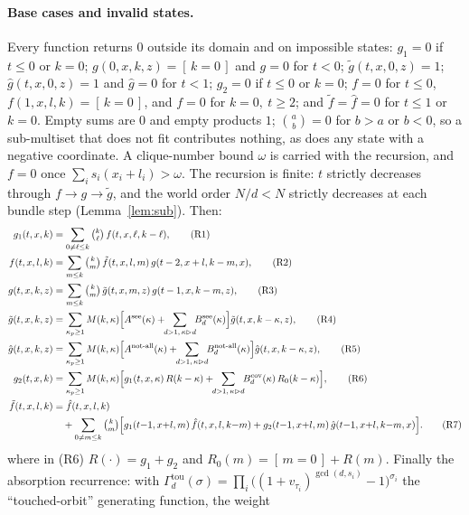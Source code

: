 \documentclass[11pt]{article}
\theoremstyle{plain}
\theoremstyle{definition}
\newcommand{\gtil}{\tilde g}
\newcommand{\ghat}{\hat g}
\newcommand{\ftil}{\tilde f}
\newcommand{\fhat}{\hat f}
\begin{document}
\paragraph{Base cases and invalid states.} Every function returns $0$ outside its domain and on
impossible states: $g_1=0$ if $t\le0$ or $k=0$; $g(0,x,k,z)=[\,k=0\,]$ and $g=0$ for $t<0$;
$\gtil(t,x,0,z)=1$; $\ghat(t,x,0,z)=1$ and $\ghat=0$ for $t<1$; $g_2=0$ if $t\le0$ or $k=0$;
$f=0$ for $t\le0$, $f(1,x,l,k)=[\,k=0\,]$, and $f=0$ for $k=0,\ t\ge2$; and $\ftil=\fhat=0$ for
$t\le1$ or $k=0$. Empty sums are $0$ and empty products $1$; $\binom{a}{b}=0$ for $b>a$ or $b<0$, so
a sub-multiset that does not fit contributes nothing, as does any state with a negative coordinate.
A clique-number bound $\omega$ is carried with the recursion, and $f=0$ once
$\sum_i s_i(x_i+l_i)>\omega$. The recursion is finite: $t$ strictly decreases through $f\to g\to\gtil$,
and the world order $N/d<N$ strictly decreases at each bundle step (Lemma~\ref{lem:sub}). Then:
\begin{align}
g_1(t,x,k)&=\sum_{0\ne\ell\le k}\tbinom{k}{\ell}\,f(t,x,\ell,k-\ell),\tag{R1}\\
f(t,x,l,k)&=\sum_{m\le k}\tbinom{k}{m}\,\ftil(t,x,l,m)\,g(t-2,x+l,k-m,x),\tag{R2}\\
g(t,x,k,z)&=\sum_{m\le k}\tbinom{k}{m}\,\gtil(t,x,m,z)\,g(t-1,x,k-m,z),\tag{R3}\\
\gtil(t,x,k,z)&=\sum_{\kappa_p\ge1}M(k,\kappa)\Big[A^{\mathrm{see}}(\kappa)+\!\!\sum_{d>1,\,\kappa\rhd d}\!\!B_d^{\mathrm{see}}(\kappa)\Big]\gtil(t,x,k-\kappa,z),\tag{R4}\\
\ghat(t,x,k,z)&=\sum_{\kappa_p\ge1}M(k,\kappa)\Big[A^{\mathrm{not\text{-}all}}(\kappa)+\!\!\sum_{d>1,\,\kappa\rhd d}\!\!B_d^{\mathrm{not\text{-}all}}(\kappa)\Big]\ghat(t,x,k-\kappa,z),\tag{R5}\\
g_2(t,x,k)&=\sum_{\kappa_p\ge1}M(k,\kappa)\Big[g_1(t,x,\kappa)\,R(k-\kappa)+\!\!\sum_{d>1,\,\kappa\rhd d}\!\!B_d^{\mathrm{cov}}(\kappa)\,R_0(k-\kappa)\Big],\tag{R6}\\
\ftil(t,x,l,k)&=\fhat(t,x,l,k)\notag\\
&\quad+\sum_{0\ne m\le k}\tbinom{k}{m}\Big[g_1(t{-}1,x{+}l,m)\,\fhat(t,x,l,k{-}m)+g_2(t{-}1,x{+}l,m)\,\ghat(t{-}1,x{+}l,k{-}m,x)\Big].\tag{R7}
\end{align}
where in (R6) $R(\cdot)=g_1+g_2$ and $R_0(m)=[\,m=0\,]+R(m)$. Finally the absorption recurrence: with
$\Gamma^{\mathrm{tou}}_d(\sigma)=\prod_i\big((1+v_{\tau_i})^{\gcd(d,s_i)}-1\big)^{\sigma_i}$ the
``touched-orbit'' generating function, the weight
\end{document}
